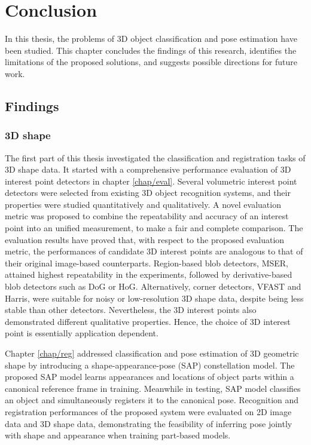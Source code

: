 \chapter{Conclusion}
\label{chap/conclusion}

In this thesis, the problems of 3D object classification and pose estimation have been studied. This chapter concludes the findings of this research, identifies the limitations of the proposed solutions, and suggests possible directions for future work.  

\section{Findings}

\subsection{3D shape}

The first part of this thesis investigated the classification and registration tasks of 3D shape data. It started with a comprehensive performance evaluation of 3D interest point detectors in chapter \ref{chap/eval}. 
Several volumetric interest point detectors were selected from existing 3D object recognition systems, and their properties were studied quantitatively and qualitatively. 
A novel evaluation metric was proposed to combine the repeatability and accuracy of an interest point into an unified measurement, to make a fair and complete comparison.  
The evaluation results have proved that, with respect to the proposed evaluation metric, the performances of candidate 3D interest points are analogous to that of their original image-based counterparts. Region-based blob detectors, \eg MSER, attained highest repeatability in the experiments, followed by derivative-based blob detectors such as DoG or HoG. Alternatively, corner detectors, \eg VFAST and Harris, were suitable for noisy or low-resolution 3D shape data, despite being less stable than other detectors.  
Nevertheless, the 3D interest points also demonstrated different qualitative properties. Hence, the choice of 3D interest point is essentially application dependent. 

Chapter \ref{chap/reg} addressed classification and pose estimation of 3D geometric shape by introducing a shape-appearance-pose (SAP) constellation model. 
The proposed SAP model learns appearances and locations of object parts within a canonical reference frame in training. Meanwhile in testing, SAP model classifies an object and simultaneously registers it to the canonical pose. 
Recognition and registration performances of the proposed system were evaluated on 2D image data and 3D shape data, demonstrating the feasibility of inferring pose jointly with shape and appearance when training part-based models. 

